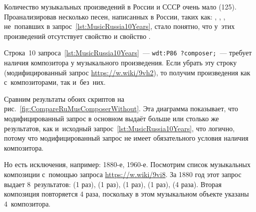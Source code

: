 Количество музыкальных произведений в России и СССР очень мало (125). 
Проанализировав несколько песен, написанных в России, таких как: 
, 
, 
, 
не~попавших в запрос~\ref{lst:MusicRussia10Years}, стало понятно, 
что у~этих произведений отсутствует свойство  и свойство .

Строка~10 запроса~\ref{lst:MusicRussia10Years}~---  
\lstinline|wdt:P86 ?composer;|~--- 
требует наличия композитора у музыкального произведения. 
Если убрать эту строку (модифицированный запрос \href{https://w.wiki/9vh2}
                                                     {https://w.wiki/9vh2}), 
то получим произведения как с~композиторами, так и~без~них. 

Сравним результаты обоих скриптов на рис.~\ref{fig:CompareRuMusComposerWithout}. 
Эта диаграмма показывает, что модифицированный запрос 
в основном выдаёт больше или столько же результатов, 
как и~исходный запрос~\ref{lst:MusicRussia10Years}, 
что логично, потому что модифицированный запрос не имеет обязательного условия наличия композитора. 

Но есть исключения, например: 1880-е, 1960-е. 
Посмотрим список музыкальных композиции с~помощью запроса \href{https://w.wiki/9vi8}
                                                               {https://w.wiki/9vi8}. 
За 1880 год этот запрос выдает 8~результатов: 
 (1 раз), 
 (1 раз), 
 (1 раз), 
 (1 раз), 
 (4 раза). 
Вторая композиция повторяется 4 раза, поскольку в этом музыкальном объекте указаны 4~композитора. 



